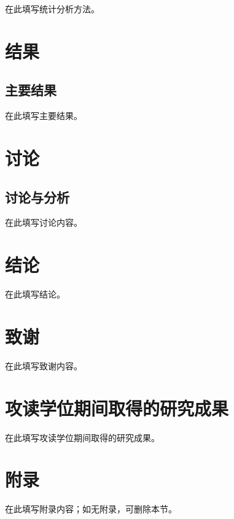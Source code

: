 \documentclass[master]{smuthesis}  %
\begin{document}
在此填写统计分析方法。

\chapter{结果}

\section{主要结果}

在此填写主要结果。

\chapter{讨论}

\section{讨论与分析}

在此填写讨论内容。

\chapter{结论}

在此填写结论。

\backmatter

\printbibliography[heading=smubibliography,title={参考文献}]

\chapter*{致\quad 谢}

在此填写致谢内容。

\chapter*{攻读学位期间取得的研究成果}

在此填写攻读学位期间取得的研究成果。

\appendix
{}
\chapter*{附录}

在此填写附录内容；如无附录，可删除本节。

\makecopyrightpage
\end{document}
